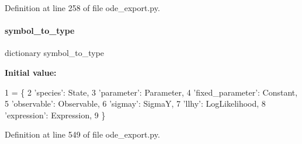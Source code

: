 Definition at line 258 of file ode\+\_\+export.\+py.

\mbox{\label{namespaceamici_1_1ode__export_a8faf4dadc2544b8b5dd81c443f66f958}} 
\paragraph{\texorpdfstring{symbol\+\_\+to\+\_\+type}{symbol\_to\_type}}
{\footnotesize\ttfamily dictionary symbol\+\_\+to\+\_\+type}

{\bfseries Initial value\+:}
\begin{DoxyCode}
1 =  \{
2     \textcolor{stringliteral}{'species'}: State,
3     \textcolor{stringliteral}{'parameter'}: Parameter,
4     \textcolor{stringliteral}{'fixed\_parameter'}: Constant,
5     \textcolor{stringliteral}{'observable'}: Observable,
6     \textcolor{stringliteral}{'sigmay'}: SigmaY,
7     \textcolor{stringliteral}{'llhy'}: LogLikelihood,
8     \textcolor{stringliteral}{'expression'}: Expression,
9 \}
\end{DoxyCode}


Definition at line 549 of file ode\+\_\+export.\+py.

